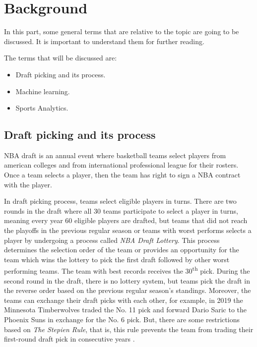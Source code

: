 \documentclass[format=sigconf]{acmart}
\begin{document}
\section{Background}
In this part, some general terms that are relative to the topic are going to be discussed. It is important to understand them for further
reading. 

The terms that will be discussed are:
\begin{itemize}
    \item  Draft picking and its process.
    \item  Machine learning.
    \item  Sports Analytics.
\end{itemize}
\subsection{Draft picking and its process}
NBA draft is an annual event where basketball teams select players from american colleges and from international professional league
for their rosters. Once a team selects a player, then the team has right to sign a NBA contract with the player.

In draft picking process, teams select eligible players in turns. There are two rounds in the draft where all 30 teams participate
to select a player in turns, meaning every year 60 eligible players are drafted, but teams that did not reach the playoffs 
in the previous regular season or teams with worst performs selects a player by undergoing a process called \textit{NBA Draft Lottery}.
This process determines the selection order of the team or provides an opportunity for the team which wins the lottery to pick the
first draft followed by other worst performing teams. The team with best records receives the 30\textsuperscript{th} pick. During the
second round in the draft, there is no lottery system, but teams pick the draft in the reverse order based on the previous regular 
season's standings. Moreover, the teams can exchange their draft picks with each other, for example, in 2019 the Minnesota Timberwolves 
traded the No. 11 pick and forward Dario Saric to the Phoenix Suns in exchange for the No. 6 pick. But, there are some restrictions
based on \textit{The Stepien Rule}, that is, this rule prevents the team from trading their first-round draft pick in consecutive 
years \cite{draft}.
\end{document}
